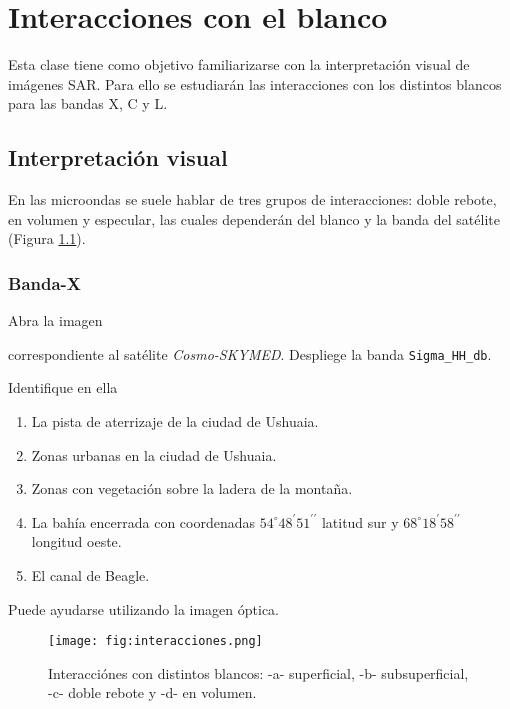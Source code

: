 \chapter{Interacciones con el blanco}

Esta clase tiene como objetivo familiarizarse con la interpretación visual de imágenes SAR. Para ello se estudiarán las interacciones con los distintos blancos para las bandas X, C y L.

\section{Interpretación visual}

En las microondas se suele hablar de tres grupos de interacciones: doble rebote, en volumen y especular, las cuales dependerán del blanco y la banda del satélite (Figura \ref{fig:interacciones}).

\subsection{Banda-X}

Abra la imagen
\begin{center}
\end{center}
correspondiente al satélite \emph{Cosmo-SKYMED}. Despliege la banda \texttt{Sigma\_HH\_db}.

Identifique en ella

\begin{enumerate}
    \item La pista de aterrizaje de la ciudad de Ushuaia.
    \item Zonas urbanas en la ciudad de Ushuaia.
    \item Zonas con vegetación sobre la ladera de la montaña.
    \item La bahía encerrada con coordenadas $54^\circ 48^\prime 51^{\prime\prime}$ latitud sur y $68^\circ 18^\prime 58^{\prime\prime}$ longitud oeste.
    \item El canal de Beagle.
\end{enumerate}

Puede ayudarse utilizando la imagen óptica.

\begin{figure}[h!]
    \centering
    \texttt{[image: fig:interacciones.png]}
    \caption{Interacciónes con distintos blancos: -a- superficial, -b- subsuperficial, -c- doble rebote y -d- en volumen.}
    \label{fig:interacciones}
\end{figure}


